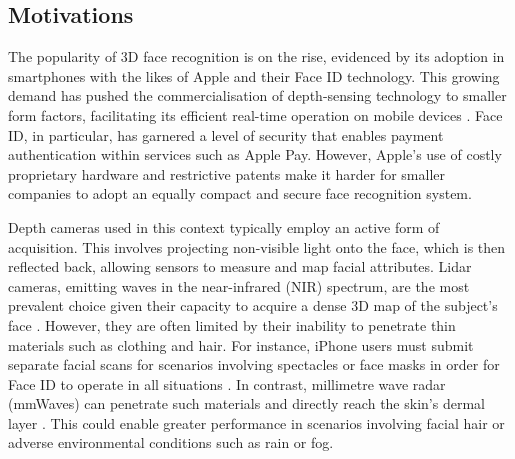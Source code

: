 \documentclass{mpaper}
\begin{document}
\subsection{Motivations}
The popularity of 3D face recognition is on the rise, evidenced by its adoption in smartphones with the likes of Apple and their Face ID \cite{apple-faceid} technology. This growing demand has pushed the commercialisation of depth-sensing technology to smaller form factors, facilitating its efficient real-time operation on mobile devices \cite{soumya2023recent}. Face ID, in particular, has garnered a level of security that enables payment authentication within services such as Apple Pay. However, Apple's use of costly proprietary hardware and restrictive patents make it harder for smaller companies to adopt an equally compact and secure face recognition system.

Depth cameras used in this context typically employ an active form of acquisition. This involves projecting non-visible light onto the face, which is then reflected back, allowing sensors to measure and map facial attributes. Lidar cameras, emitting waves in the near-infrared (NIR) spectrum, are the most prevalent choice given their capacity to acquire a dense 3D map of the subject's face \cite{wang2020evolution}. However, they are often limited by their inability to penetrate thin materials such as clothing and hair. For instance, iPhone users must submit separate facial scans for scenarios involving spectacles or face masks in order for Face ID to operate in all situations \cite{apple-faceid-mask}. In contrast, millimetre wave radar (mmWaves) can penetrate such materials and directly reach the skin's dermal layer \cite{vizard2006advances}. This could enable greater performance in scenarios involving facial hair or adverse environmental conditions such as rain or fog.
\end{document}
